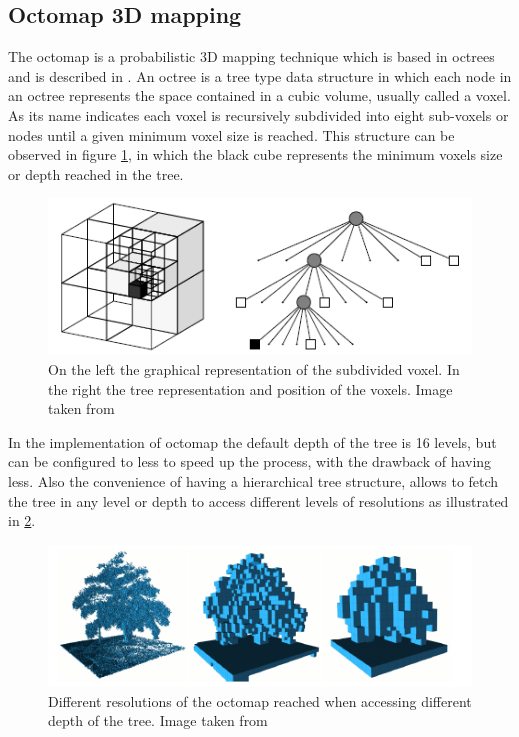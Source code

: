 \documentclass[fontsize=12pt]{article}
\begin{document}
\subsection{Octomap 3D mapping}
The octomap is a  probabilistic 3D mapping technique which is based in octrees and is described in \cite{bib:octree}. An octree is a tree type data structure in which each node in an octree represents the space contained in a cubic volume, usually called a voxel. As its name indicates each voxel is recursively subdivided into eight sub-voxels or nodes until a given minimum voxel size is reached. This structure can be observed in figure \ref{fig:octree}, in which the black cube represents the minimum voxels size or depth reached in the tree. 
\begin{figure}[H]
\begin{center}
\includegraphics[width=0.8\linewidth]{images/octree}
\caption{On the left the graphical representation of the subdivided voxel. In the right the tree representation and position of the voxels. Image taken from \cite{bib:octomap}}
\label{fig:octree}
\end{center}
\end{figure}
In the implementation of octomap the  default depth of the tree is 16 levels, but can be configured to less to speed up the process, with the drawback of having less. Also the convenience of having a hierarchical tree structure, allows to fetch the tree in any level or depth to access different levels of resolutions as illustrated in  \ref{fig:difrefocto}. 
\begin{figure}[H]
\begin{center}
\includegraphics[width=0.8\linewidth]{images/treedifres}
\caption{Different resolutions of the octomap reached when accessing different depth of the tree. Image taken from \cite{bib:octomap}}
\label{fig:difrefocto}
\end{center}
\end{figure}
\end{document}
